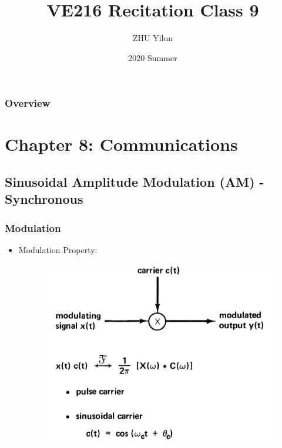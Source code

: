 \documentclass{beamer}
\title[VE216]{VE216 Recitation Class 9} %
\author{ZHU Yilun} %
\institute[SJTU] %
{
UM-SJTU Joint Institute \\ %
\medskip
\textit{VE216 SU20 TA Group} %
}
\date{2020 Summer} %
\begin{document}
\begin{frame}
\titlepage %
\end{frame}

\begin{frame}
\frametitle{Overview} %
\tableofcontents %
\end{frame}







\section{Chapter 8: Communications}
\subsection{Sinusoidal Amplitude Modulation (AM) - Synchronous}

\begin{frame}
\frametitle{Modulation}
\begin{itemize}
\item Modulation Property:
\begin{figure}
\includegraphics[width=0.8\linewidth]{AM1}
\end{figure}
\end{itemize}
\end{frame}
\end{document}
